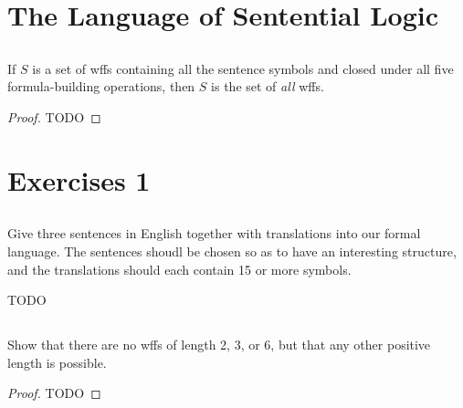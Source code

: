 \documentclass{report}
\begin{document}
\section{The Language of Sentential Logic}%

\subsection{}%

  \begin{theorem}
    If $S$ is a set of wffs containing all the sentence symbols and closed under
      all five formula-building operations, then $S$ is the set of \textit{all}
      wffs.
  \end{theorem}

  \begin{proof}
    TODO
  \end{proof}

\section{Exercises 1}%

\subsection{}%

  Give three sentences in English together with translations into our formal
    language.
  The sentences shoudl be chosen so as to have an interesting structure, and the
    translations should each contain 15 or more symbols.

  \begin{answer}
    TODO
  \end{answer}

\subsection{}%

  Show that there are no wffs of length 2, 3, or 6, but that any other positive
    length is possible.

  \begin{proof}
    TODO
  \end{proof}

\subsection{}%
\end{document}
